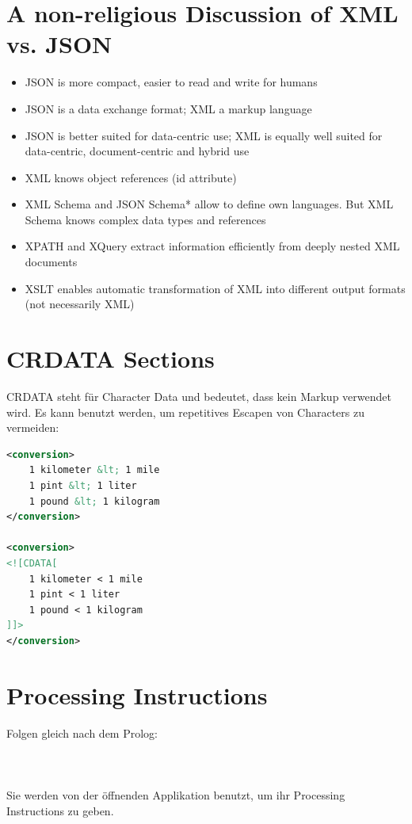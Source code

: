 \section{A non-religious Discussion of XML vs. JSON}
\begin{itemize}
\item JSON is more compact, easier to read and write for humans
\item JSON is a data exchange format; XML a markup language
\item JSON is better suited for data-centric use; XML is equally well suited for data-centric, document-centric and hybrid use
\item XML knows object references (id attribute)
\item XML Schema and JSON Schema* allow to define own languages.
But XML Schema knows complex data types and references
\item XPATH and XQuery extract information efficiently from deeply nested XML documents
\item XSLT enables automatic transformation of XML into different output formats (not necessarily XML)
\end{itemize}

\section{CRDATA Sections}
CRDATA steht für Character Data und bedeutet, dass kein Markup verwendet wird. Es kann benutzt werden, um repetitives Escapen von Characters zu vermeiden:
\begin{lstlisting}[language=XML, caption=CRDATA]
<conversion>
	1 kilometer &lt; 1 mile
	1 pint &lt; 1 liter
	1 pound &lt; 1 kilogram 
</conversion>

<conversion>
<![CDATA[
	1 kilometer < 1 mile
	1 pint < 1 liter
	1 pound < 1 kilogram
]]>
</conversion>

\end{lstlisting}

\section{Processing Instructions}
Folgen gleich nach dem Prolog:\\

\\

\\\\
Sie werden von der öffnenden Applikation benutzt, um ihr Processing Instructions zu geben.


